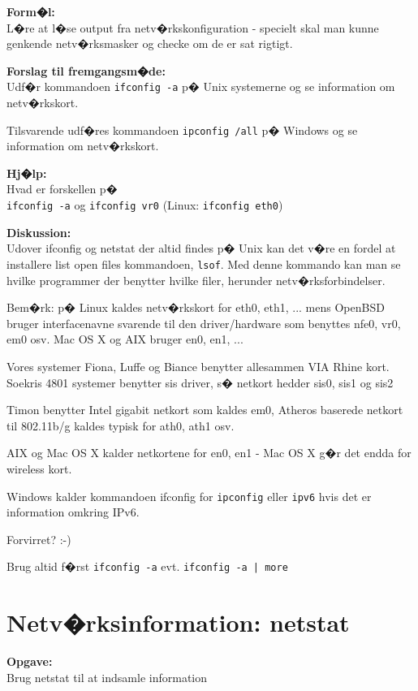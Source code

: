 \documentclass[a4paper,11pt,notitlepage]{oevelser}
\begin{document}
{\bfseries Form�l:}\\
L�re at l�se output fra netv�rkskonfiguration - specielt skal man kunne genkende netv�rksmasker og checke om de er sat rigtigt.

{\bfseries Forslag til fremgangsm�de:}\\
Udf�r kommandoen \verb+ifconfig -a+ p� Unix systemerne og
se information om netv�rkskort.

Tilsvarende udf�res kommandoen \verb+ipconfig /all+ p� Windows og
se information om netv�rkskort.


{\bfseries Hj�lp:}\\
Hvad er forskellen p�\\
\verb+ifconfig -a+ og \verb+ifconfig vr0+ (Linux: \verb+ifconfig eth0+)

{\bfseries Diskussion:}\\
Udover ifconfig og netstat der altid findes p� Unix kan det v�re en
fordel at installere list open files kommandoen, \verb+lsof+. Med
denne kommando kan man se hvilke programmer der benytter hvilke filer,
herunder netv�rksforbindelser.

Bem�rk: p� Linux kaldes netv�rkskort for eth0, eth1, ... mens OpenBSD
bruger interfacenavne svarende til den driver/hardware som benyttes
nfe0, vr0, em0 osv. Mac OS X og AIX bruger en0, en1, ...

Vores systemer Fiona, Luffe og Biance benytter allesammen VIA Rhine kort.
Soekris 4801 systemer benytter sis driver, s� netkort hedder sis0, sis1 og sis2

Timon benytter Intel gigabit netkort som kaldes em0, Atheros baserede netkort til 802.11b/g kaldes typisk for ath0, ath1 osv.

AIX og Mac OS X kalder netkortene for en0, en1 - Mac OS X g�r det endda for wireless kort.

Windows kalder kommandoen ifconfig for \verb+ipconfig+ eller \verb+ipv6+ hvis det er information omkring IPv6.

Forvirret? :-)

Brug altid f�rst \verb+ifconfig -a+ evt. \verb+ifconfig -a | more+



\chapter{Netv�rksinformation: netstat}
\label{ex:network-netstat}

{\bfseries Opgave:}\\
Brug netstat til at indsamle information
\end{document}
